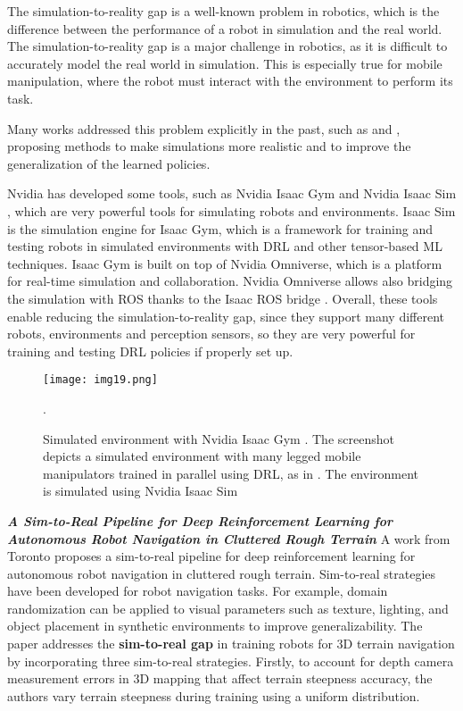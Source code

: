 The simulation-to-reality gap is a well-known problem in robotics, which is the difference
between the performance of a robot in simulation and the real world. The simulation-to-reality
gap is a major challenge in robotics, as it is difficult to accurately model the real world
in simulation. This is especially true for mobile manipulation, where the robot must interact
with the environment to perform its task.

Many works addressed this problem explicitly in the past, such as \cite{liu2021deep} and
\cite{zhang2021simtoreal}, proposing methods to make simulations more realistic and
to improve the generalization of the learned policies.

Nvidia has developed some tools, such as Nvidia Isaac Gym \cite{isaacgym} and Nvidia Isaac Sim
\cite{isaacsim}, which are very powerful tools for simulating robots and environments.
Isaac Sim is the simulation engine for Isaac Gym, which is a framework for training and
testing robots in simulated environments with DRL and other tensor-based ML techniques.
Isaac Gym is built on top of Nvidia Omniverse, which is a platform for real-time
simulation and collaboration. Nvidia Omniverse allows also bridging the simulation with ROS
thanks to the Isaac ROS bridge \cite{isaacros}. Overall, these tools enable reducing the
simulation-to-reality gap, since they support many different robots, environments and perception
sensors, so they are very powerful for training and testing DRL policies if properly set up.

\begin{figure}[ht]
	\centering
	\texttt{[image: img19.png]}
	\captionsetup{width=1\linewidth}
	\caption{Simulated environment with Nvidia Isaac Gym \cite{isaacros}.
		The screenshot depicts a simulated environment with many legged mobile manipulators trained in
		parallel using DRL, as in \cite{mittal2022articulated}.
		The environment is simulated using Nvidia Isaac Sim \cite{isaacsim}}.
	\label{fig:img19}
\end{figure}


\textbf{\textit{A Sim-to-Real Pipeline for Deep Reinforcement
		Learning for Autonomous Robot Navigation in
		Cluttered Rough Terrain}} \quad
A work from Toronto \cite{zhang2021simtoreal} proposes a sim-to-real pipeline for
deep reinforcement learning for autonomous robot navigation in cluttered rough terrain.
Sim-to-real strategies have been developed for robot navigation tasks. For example,
domain randomization can be applied to visual parameters such as texture,
lighting, and object placement in synthetic environments to improve generalizability.
The paper \cite{zhang2021simtoreal} addresses the \textbf{sim-to-real gap} in training robots for
3D terrain navigation by incorporating three sim-to-real strategies. Firstly, to account
for depth camera measurement errors in 3D mapping that affect terrain steepness accuracy,
the authors vary terrain steepness during training using a uniform distribution.

